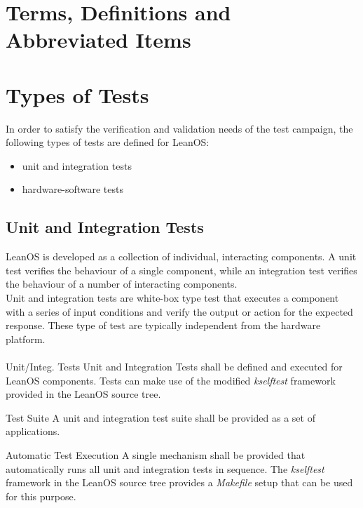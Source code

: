 \printbibliography[heading=none]


\chapter{Terms, Definitions and Abbreviated Items}
\printglossary[type=acronym]
\printglossary[type=main, style=altlist]


\chapter{Types of Tests}

In order to satisfy the verification and validation needs of the test campaign,
the following types of tests are defined for LeanOS:
\begin{itemize}
	\item unit and integration tests
	\item hardware-software tests
\end{itemize}


\section {Unit and Integration Tests}

LeanOS is developed as a collection of individual, interacting components.
A unit test verifies the behaviour of a single component, while an integration
test verifies the behaviour of a number of interacting components. \\

\noindent
Unit and integration tests are white-box type test that executes a component
with a series of input conditions and verify the output or action for the
expected response. These type of test are typically independent from the
hardware platform.\\
\\

 {Unit/Integ. Tests}{%
Unit and Integration Tests shall be defined and executed for LeanOS components.
}{Tests can make use of the modified \emph{kselftest} framework provided %
in the LeanOS source tree.
}%

 {Test Suite}{%
A unit and integration test suite shall be provided as a set of applications.
}{}%

 {Automatic Test Execution}{%
A single mechanism shall be provided that automatically runs all unit and %
integration tests in sequence.%
}{The \emph{kselftest} framework in the LeanOS source tree provides a %
\emph{Makefile} setup that can be used for this purpose.}%


